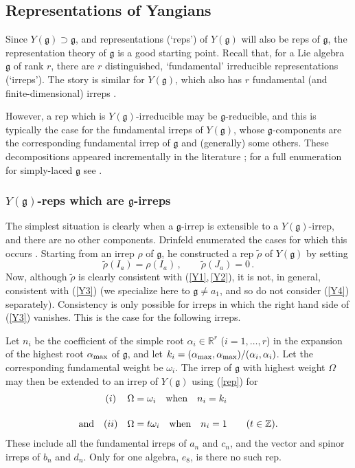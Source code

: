 \documentclass[12pt]{article}
\newcommand{\gf}{\mathfrak{g}}
\begin{document}
\subsection{Representations of Yangians}

Since $Y(\gf)\supset \gf$, and representations (`reps') of $Y(\gf)$
will also be reps of $\gf$, the representation theory of $\gf$ is a
good starting point. Recall that, for a Lie algebra $\gf$ of rank
$r$, there are $r$ distinguished, `fundamental' irreducible
representations (`irreps'). The story is similar for $Y(\gf)$,
which also has $r$ fundamental (and finite-dimensional) irreps
\cite{gron,drinf88}.

However, a rep which is  $Y(\gf)$-irreducible may be
$\gf$-reducible, and this is typically the case for the fundamental
irreps of $Y(\gf)$, whose $\gf$-components are the corresponding
fundamental irrep of $\gf$ and (generally) some others. These
decompositions appeared incrementally in the literature
\cite{ogiev86,chari91,KR}; for a full enumeration for simply-laced
$\gf$ see \cite{kleber96}.

\subsubsection{$Y(\gf)$-reps which are $\gf$-irreps}

The simplest situation is clearly when a $\gf$-irrep is extensible
to a $Y(\gf)$-irrep, and there are no other components. Drinfeld
enumerated the cases for which this occurs \cite{drinf1}. Starting
from an irrep $\rho$ of $\gf$, he constructed a rep $\tilde{\rho}$
of $Y(\gf)$ by setting
\begin{equation}\label{rep}
\tilde\rho(I_a) = \rho(I_a) \,, \qquad \tilde\rho(J_a) = 0 \,.
\end{equation}
Now, although $\tilde\rho$ is clearly consistent with
(\ref{Y1},\,\ref{Y2}), it is not, in general, consistent with
(\ref{Y3}) (we specialize here to $\gf\neq a_1$, and so do not
consider (\ref{Y4}) separately). Consistency is only possible for
irreps in which the right hand side of (\ref{Y3}) vanishes. This
is the case for the following irreps.

 Let $n_i$ be the coefficient of the simple
root ${\alpha}_i\in{\mathbb R}^r$ ($i=1,\ldots,r$) in the
expansion of the highest root ${\alpha}_{\rm max}$ of $\gf$, and
let $k_i = ({\alpha}_{\rm max},{\alpha}_{\rm
max})/({\alpha}_i,{\alpha}_i)$. Let the corresponding fundamental
weight be ${\omega}_i$. The irrep of $\gf$ with highest weight
${\Omega}$ may then be extended to an irrep of $Y(\gf)$ using
(\ref{rep}) for \begin{equation}
\begin{array}{rcl}
 & (i) & {\Omega}={\omega}_i \quad {\rm when } \quad
 n_i=k_i\\[0.2in]

 {\rm and} & (ii) &
  {\Omega}=t{\omega}_i\quad {\rm when }
 \quad n_i=1
 \qquad (t\in{\mathbb Z}).\end{array}\label{irreps} \end{equation}
These include all the fundamental irreps of $a_n$ and $c_n$, and
the vector and spinor irreps of $b_n$ and $d_n$. Only for one
algebra, $e_8$, is there no such rep.
\end{document}
